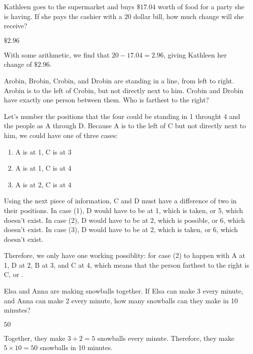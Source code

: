 \documentclass[11pt]{article}
\begin{document}
\begin{problem}
Kathleen goes to the supermarket and buys $\$17.04$ worth of food for a party she is having. If she pays the cashier with a 20 dollar bill, how much change will she receive?
\end{problem}
\begin{answer}
$\boxed{\$2.96}$
\end{answer}
\begin{solution}
With some arithmetic, we find that $20 - 17.04 = 2.96$, giving Kathleen her change of $\boxed{\$2.96}$.
\end{solution}

\begin{problem} Arobin, Brobin, Crobin, and Drobin are standing in a line, from left to right. Arobin is to the left of Crobin, but not directly next to him. Crobin and Drobin have exactly one person between them. Who is farthest to the right?
\end{problem}
\begin{answer}
\end{answer}
\begin{solution}
Let's number the positions that the four could be standing in 1 throught 4 and the people as A through D. Because A is to the left of C but not directly next to him, we could have one of three cases:

\begin{enumerate}
\item A is at 1, C is at 3
\item A is at 1, C is at 4
\item A is at 2, C is at 4
\end{enumerate}

Using the next piece of information, C and D must have a difference of two in their positions. In case (1), D would have to be at 1, which is taken, or 5, which doesn't exist. In case (2), D would have to be at 2, which is possible, or 6, which doesn't exist. In case (3), D would have to be at 2, which is taken, or 6, which doesn't exist. 

Therefore, we only have one working possiblity: for case (2) to happen with A at 1, D at 2, B at 3, and C at 4, which means that the person farthest to the right is C, or .
\end{solution}
\begin{problem}
Elsa and Anna are making snowballs together. If Elsa can make 3 every minute, and Anna can make 2 every minute, how many snowballs can they make in 10 minutes?
\end{problem}
\begin{answer}
$\boxed{50}$
\end{answer}
\begin{solution}
Together, they make $3 + 2 = 5$ snowballs every minute. Therefore, they make $5\times10 = \boxed{50}$ snowballs in 10 minutes.
\end{solution}
\end{document}

